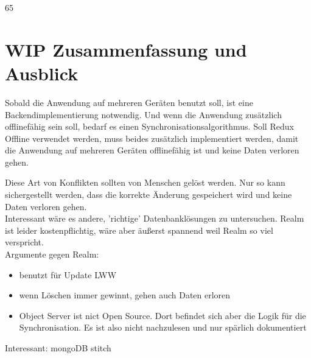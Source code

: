65\chapter{\label{chap:fazit}WIP Zusammenfassung und Ausblick}

Sobald die Anwendung auf mehreren Geräten benutzt soll, ist eine Backendimplementierung notwendig.
Und wenn die Anwendung zusätzlich offlinefähig sein soll, bedarf es einen Synchronisationsalgorithmus.
Soll Redux Offline verwendet werden, muss beides zusätzlich implementiert werden, damit die Anwendung auf mehreren Geräten offlinefähig ist und keine Daten verloren gehen.

Diese Art von Konflikten sollten von Menschen gelöst werden. Nur so kann sichergestellt werden, dass die korrekte Änderung gespeichert wird und keine Daten verloren gehen.\\
% 
% 
% 
 
Interessant wäre es andere, 'richtige' Datenbanklösungen zu untersuchen. 
Realm ist leider kostenpflichtig, wäre aber äußerst spannend weil Realm so viel verspricht.\\
Argumente gegen Realm:
\begin{itemize}
  \item benutzt für Update LWW
  \item wenn Löschen immer gewinnt, gehen auch Daten erloren
  \item Object Server ist nict Open Source. Dort befindet sich aber die Logik für die Synchronisation. Es ist also nicht nachzulesen und nur spärlich dokumentiert
\end{itemize}
% 
% 
% 
Interessant: mongoDB stitch ~\cite{stitch}